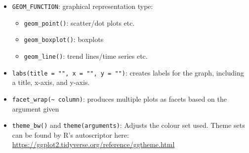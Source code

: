 \documentclass{article}
\begin{document}
\begin{itemize}
\begin{itemize}
        \item \verb|GEOM_FUNCTION|: graphical representation type:
        \begin{itemize}
            \item \verb|geom_point()|: scatter/dot plots etc.
            \item \verb|geom_boxplot()|: boxplots
            \item \verb|geom_line()|: trend lines/time series etc.
        \end{itemize}
        \item \verb|labs(title = "", x = "", y = "")|: creates labels for the graph, including a title, x-axis, and y-axis.
        \item \verb|facet_wrap(~ column)|: produces multiple plots as facets based on the argument given
        \item \verb|theme_bw()| and \verb|theme(arguments)|: Adjusts the colour set used. Theme sets can be found by R's autoscriptor here:\\
        \url{https://ggplot2.tidyverse.org/reference/ggtheme.html}
    \end{itemize}
\end{itemize}
\end{document}
